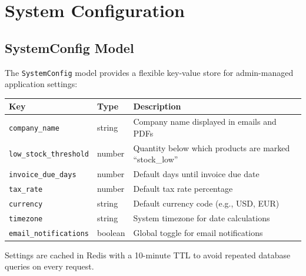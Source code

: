 \documentclass[12pt,a4paper]{report}
\begin{document}
\section{System Configuration}

\subsection{SystemConfig Model}

The \texttt{SystemConfig} model provides a flexible key-value store for admin-managed application settings:

\begin{center}
\begin{tabularx}{\textwidth}{llX}
  \toprule
  \textbf{Key} & \textbf{Type} & \textbf{Description} \\
  \midrule
  \texttt{company\_name}        & string  & Company name displayed in emails and PDFs \\
  \texttt{low\_stock\_threshold} & number  & Quantity below which products are marked ``stock\_low'' \\
  \texttt{invoice\_due\_days}   & number  & Default days until invoice due date \\
  \texttt{tax\_rate}            & number  & Default tax rate percentage \\
  \texttt{currency}             & string  & Default currency code (e.g., USD, EUR) \\
  \texttt{timezone}             & string  & System timezone for date calculations \\
  \texttt{email\_notifications} & boolean & Global toggle for email notifications \\
  \bottomrule
\end{tabularx}
\end{center}

Settings are cached in Redis with a 10-minute TTL to avoid repeated database queries on every request.



\usepackage[a4paper, margin=2.5cm]{geometry}
\usepackage[T1]{fontenc}
\usepackage[utf8]{inputenc}
\usepackage{lmodern}
\usepackage{microtype}
\usepackage{xcolor}
\usepackage{graphicx}
\usepackage{booktabs}
\usepackage{longtable}
\usepackage{array}
\usepackage{tabularx}
\usepackage{multirow}
\usepackage{enumitem}
\usepackage{listings}
\usepackage{fancyhdr}
\usepackage{titlesec}
\usepackage{tocloft}
\usepackage{hyperref}
\usepackage{amsmath}
\usepackage{amssymb}
\usepackage{tikz}
\usetikzlibrary{shapes.geometric,arrows.meta,positioning,fit,backgrounds,calc}
\usepackage{tcolorbox}
\usepackage{setspace}
\usepackage{caption}
\usepackage{subcaption}
\usepackage{mdframed}
\end{document}
